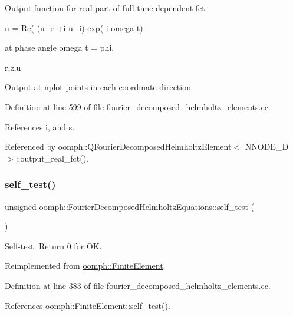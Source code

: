 Output function for real part of full time-\/dependent fct

u = Re( (u\+\_\+r +i u\+\_\+i) exp(-\/i omega t)

at phase angle omega t = phi.

r,z,u

Output at nplot points in each coordinate direction 

Definition at line 599 of file fourier\+\_\+decomposed\+\_\+helmholtz\+\_\+elements.\+cc.



References i, and s.



Referenced by oomph\+::\+Q\+Fourier\+Decomposed\+Helmholtz\+Element$<$ N\+N\+O\+D\+E\+\_\+D $>$\+::output\+\_\+real\+\_\+fct().

\mbox{\label{classoomph_1_1FourierDecomposedHelmholtzEquations_a5cf034d730e1f1f87be5400d20a57031}} 
\subsubsection{\texorpdfstring{self\+\_\+test()}{self\_test()}}
{\footnotesize\ttfamily unsigned oomph\+::\+Fourier\+Decomposed\+Helmholtz\+Equations\+::self\+\_\+test (\begin{DoxyParamCaption}{ }\end{DoxyParamCaption})\hspace{0.3cm}{\ttfamily [virtual]}}



Self-\/test\+: Return 0 for OK. 



Reimplemented from \hyperlink{classoomph_1_1FiniteElement_af94c5a5e22175d5420b33b3b79e46ed3}{oomph\+::\+Finite\+Element}.



Definition at line 383 of file fourier\+\_\+decomposed\+\_\+helmholtz\+\_\+elements.\+cc.



References oomph\+::\+Finite\+Element\+::self\+\_\+test().

\mbox{\label{classoomph_1_1FourierDecomposedHelmholtzEquations_aa27c6f570be67df3e68c26f6e28fc28a}} 
